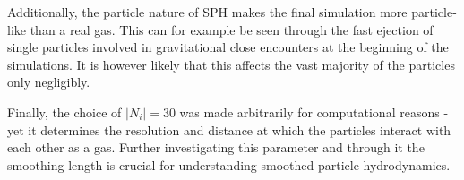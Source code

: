 \documentclass[../main.tex]{subfiles}
\begin{document}
Additionally, the particle nature of SPH makes the final simulation more particle-like than a real
gas. This can for example be seen through the fast ejection of single particles involved in
gravitational close encounters at the beginning of the simulations. It is however likely that this
affects the vast majority of the particles only negligibly.

Finally, the choice of $|N_i| = 30$ was made arbitrarily for computational reasons - yet it
determines the resolution and distance at which the particles interact with each other as a gas.
Further investigating this parameter and through it the smoothing length is crucial for
understanding smoothed-particle hydrodynamics.
\end{document}
